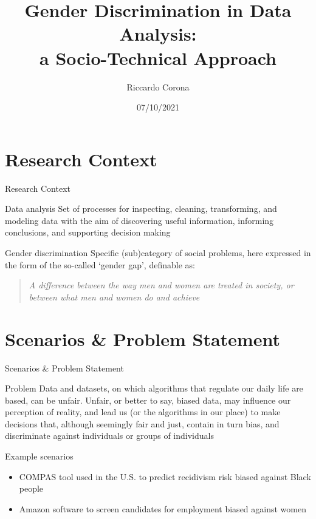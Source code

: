 \documentclass[usenames,dvipsnames]{beamer}
\title{Gender Discrimination in Data Analysis:\\a Socio-Technical Approach}
\author{Riccardo Corona}
\date{07/10/2021}
\begin{document}
    \begin{frame}
        \maketitle
    \end{frame}
    
    
    \section[]{Research Context}
    \begin{frame}{Research Context}
        \begin{block}{Data analysis}
            Set of processes for inspecting, cleaning, transforming, and modeling data with the aim of discovering useful information, informing conclusions, and supporting decision making
        \end{block}
        \begin{block}{Gender discrimination}
            Specific (sub)category of social problems, here expressed in the form of the so-called `{gender gap}', definable as:
            \begin{quote}
            \emph{A difference between the way men and women are treated in society, or between what men and women do and achieve} \parencite{cambridge2013gender}
            \end{quote}
        \end{block}
    \end{frame}
    
    
    \section[]{Scenarios \& Problem Statement}
    \begin{frame}{Scenarios \& Problem Statement}
        \begin{block}{Problem}
            Data and datasets, on which algorithms that regulate our daily life are based, can be {unfair}. Unfair, or better to say, {biased} data, may influence our perception of reality, and lead us (or the algorithms in our place) to make decisions that, although seemingly fair and just, contain in turn bias, and discriminate against individuals or groups of individuals
        \end{block}
        \begin{exampleblock}{Example scenarios}
            \begin{itemize}
                \item \textcolor{greenPolimi}{COMPAS} tool used in the U.S. to predict recidivism risk biased against Black people \emph{\parencite{angwin2016machine}}
                \item \textcolor{greenPolimi}{Amazon} software to screen candidates for employment biased against women \emph{\parencite{dastin2018amazon}}
            \end{itemize}
        \end{exampleblock}
    \end{frame}
    
\end{document}
